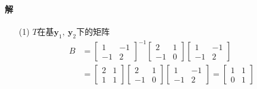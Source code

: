 \documentclass[12pt, a4paper, oneside, fontset=none]{ctexart}
\begin{document}
\paragraph*{解}
\begin{enumerate}
    \paragraph*{解}
    \item[(1)] $T$在基$\bm{y}_1,\ \bm{y}_2$下的矩阵
        \begin{align*}
            B & = \begin{bmatrix}
                      1  & -1 \\
                      -1 & 2
                  \end{bmatrix}^{-1} \begin{bmatrix}
                                         2  & 1 \\
                                         -1 & 0
                                     \end{bmatrix} \begin{bmatrix}
                                                       1  & -1 \\
                                                       -1 & 2
                                                   \end{bmatrix}            \\
              & = \begin{bmatrix}
                      2 & 1 \\
                      1 & 1
                  \end{bmatrix} \begin{bmatrix}
                                    2  & 1 \\
                                    -1 & 0
                                \end{bmatrix} \begin{bmatrix}
                                                  1  & -1 \\
                                                  -1 & 2
                                              \end{bmatrix} = \begin{bmatrix}
                                                                  1 & 1 \\
                                                                  0 & 1
                                                              \end{bmatrix}

\end{align*}
\end{enumerate}
\end{document}
